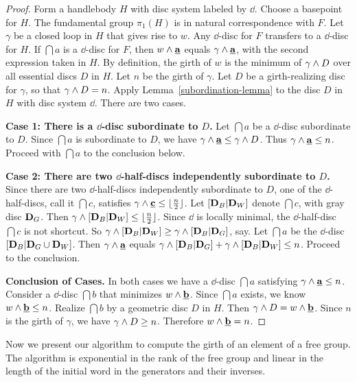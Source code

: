 \begin{proof}
Form a handlebody $H$ with disc system labeled by $\dd$.  Choose a basepoint for $H$.  The fundamental group $\pi_{1}(H)$ is in natural correspondence with $F$.  Let $\gamma$ be a closed loop in $H$ that gives rise to $w$.  Any $\dd$-disc for $F$ transfers to a $\dd$-disc for $H$.  If $\dint{a}$ is a $\dd$-disc for $F$, then $w\wedge\mathbf{\underline{a}}$ equals $\gamma\wedge\mathbf{\underline{a}}$, with the second expression taken in $H$.  By definition, the girth of $w$ is the minimum of $\gamma\wedge D$ over all essential discs $D$ in $H$.  Let $n$ be the girth of $\gamma$.  Let $D$ be a girth-realizing disc for $\gamma$, so that $\gamma\wedge D=n$.  Apply Lemma~\ref{subordination-lemma} to the disc $D$ in $H$ with disc system $\dd$.  There are two cases.

\textbf{Case 1:  There is a $\dd$-disc subordinate to $D$.}
Let $\dint{a}$ be a $\dd$-disc subordinate to $D$.  Since $\dint{a}$ 
is subordinate to $D$, we have $\gamma\wedge\mathbf{\underline{a}}\leq\gamma\wedge D$.
Thus $\gamma\wedge\mathbf{\underline{a}}\leq n$.  Proceed with $\dint{a}$ to the conclusion 
below.

\textbf{Case 2:  There are two $\dd$-half-discs independently 
subordinate to $D$.}  Since there are two $\dd$-half-discs independently subordinate to $D$, one of the $\dd$-half-discs, call it $\dint{c}$, satisfies 
$\gamma\wedge\mathbf{\underline{c}}\leq\lfloor\frac{n}{2}\rfloor$.  Let $[\mathbf{D}_B | \mathbf{D}_W]$ denote $\dint{c}$, with gray disc $\mathbf{D}_G$.  Then $\gamma\wedge[\mathbf{D}_B | \mathbf{D}_W]\leq\lfloor\frac{n}{2}\rfloor$.  Since $\dd$ is locally minimal, the $\dd$-half-disc $\dint{c}$ is not shortcut.  So $\gamma\wedge[\mathbf{D}_B | \mathbf{D}_W]\geq\gamma\wedge[\mathbf{D}_B | \mathbf{D}_G]$, say.  Let $\dint{a}$ be the $\dd$-disc $[\mathbf{D}_B | \mathbf{D}_G\cup\mathbf{D}_W]$.  Then $\gamma\wedge\mathbf{\underline{a}}$ equals $\gamma\wedge[\mathbf{D}_B | \mathbf{D}_G]+\gamma\wedge[\mathbf{D}_B | \mathbf{D}_W]\leq n$.  Proceed to the conclusion.

\textbf{Conclusion of Cases.}
In both cases we have a $\dd$-disc $\dint{a}$ satisfying 
$\gamma\wedge\mathbf{\underline{a}}\leq n$.  Consider a $\dd$-disc $\dint{b}$ that minimizes $w\wedge\mathbf{\underline{b}}$.  Since $\dint{a}$ exists, we know $w\wedge\mathbf{\underline{b}}\leq n$.  Realize $\dint{b}$ by a geometric disc $D$ in $H$.  Then $\gamma\wedge D=w\wedge\mathbf{\underline{b}}$.  Since $n$ is the girth of $\gamma$, we have $\gamma\wedge D\geq n$.  Therefore 
$w\wedge\mathbf{\underline{b}}=n$.
\end{proof}

Now we present our algorithm to compute the girth of an element of a free group.  The algorithm is exponential in the rank of the free group and linear in the length of the initial word in the generators and their inverses.

